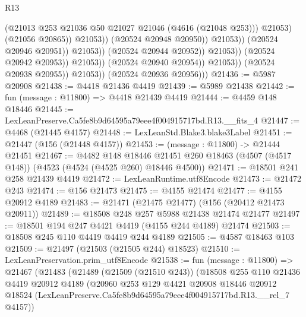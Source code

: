 \begin{lexlean}{R13}
\begin{coremodule}
                                                    (@21013
                                                      @253
                                                      @21036
                                                      @50
                                                      @21027
                                                      @21046
                                                      (@4616 (@21048 @253)))
                                                    @21053)
                                                  (@21056 @20865))
                                                @21053))
                                            (@20524 @20948 @20950))
                                          @21053))
                                      (@20524 @20946 @20951))
                                    @21053))
                                (@20524 @20944 @20952))
                              @21053))
                          (@20524 @20942 @20953))
                        @21053))
                    (@20524 @20940 @20954))
                  @21053))
              (@20524 @20938 @20955))
            @21053))
        (@20524 @20936 @20956)))
@21436 := @5987 @20908
@21438 := @4418 @21436 @4419
@21439 := @5989 @21438
@21442 := fun (message : @11800) => @4418 @21439 @4419
@21444 := @4459 @148 @18446
@21445 := LexLeanPreserve.Ca5fe8b9d64595a79eee4f004915717bd.R13.__fits_4
@21447 := @4468 (@21445 @4157)
@21448 := LexLeanStd.Blake3.blake3Label
@21451 := @21447 (@156 (@21448 @4157))
@21453 := (message : @11800) -> @21444 @21451
@21467 := @4482
    @148
    @18446
    @21451
    @260
    @18463
    (@4507 (@4517 @148))
    (@4523 (@4524 (@4525 @260) @18446 @4500))
@21471 := @18501 @241 @258 @21439 @4419
@21472 := LexLeanRuntime.utf8Encode
@21473 := @21472 @243
@21474 := @156 @21473
@21475 := @4155 @21474
@21477 := @4155 @20912 @4189
@21483 := @21471 (@21475 @21477) (@156 (@20412 @21473 @20911))
@21489 := @18508 @248 @257 @5988 @21438 @21474 @21477
@21497 := @18501 @194 @247 @4421 @4419 (@4155 @244 @4189) @21474
@21503 := @18508 @245 @110 @4419 @4419 @244 @4189
@21505 := @4587 @18463 @103
@21509 := @21497 (@21503 (@21505 @244) @18523)
@21510 := LexLeanPreservation.prim_utf8Encode
@21538 := fun (message : @11800) =>
  @21467
    (@21483
      (@21489
        (@21509 (@21510 @243))
        (@18508
          @255
          @110
          @21436
          @4419
          @20912
          @4189
          (@20960
            @253
            @129
            @4421
            @20908
            @18446
            @20912
            @18524
            (LexLeanPreserve.Ca5fe8b9d64595a79eee4f004915717bd.R13.__rel_7 @4157))

\end{coremodule}
\end{lexlean}
